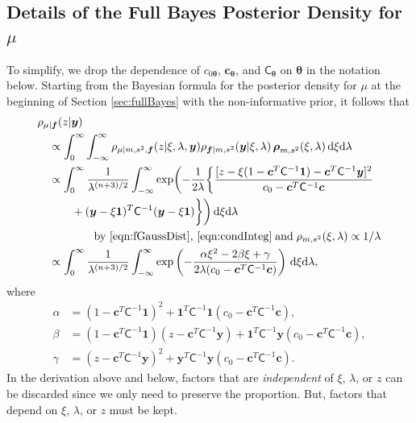 \documentclass{svjour3}                     %
\newcommand{\bm}[1]{\boldsymbol{#1}}
\newcommand{\D}[1]{\text{d}{#1}}
\newcommand{\vtheta}{{\bm{\theta}}}
\newcommand{\vc}{\bm{c}}
\newcommand{\vf}{\bm{f}}
\newcommand{\vrho}{\bm{\rho}}
\newcommand{\vy}{\bm{y}}
\newcommand{\vone}{\bm{1}}
\newcommand{\mC}{\mathsf{C}}
\begin{document}
\begin{appendices}
\section{Details of the Full Bayes Posterior Density for $\mu$} \label{appendix:full_bayes}
To simplify, we drop the dependence of $c_{0\vtheta}$, $\vc_\vtheta$, and $\mC_\vtheta$ on $\vtheta$ in the notation below.
Starting from the Bayesian formula for the posterior density for $\mu$ at the beginning of Section \ref{sec:fullBayes} with the non-informative prior, it follows that 
\begin{align*}
\MoveEqLeft[1]{\rho_{\mu|\vf}(z | \vy)}\\
& \propto \int_{0}^\infty \int_{-\infty}^\infty 
\rho_{\mu | m, s^2, \vf}(z | \xi, \lambda , \vy) 
  \rho_{\vf | m, s^2} (\vy | \xi, \lambda) \, \vrho_{m,s^2}(\xi,\lambda)  \, \D \xi \D \lambda \\
& \propto \displaystyle \int_{0}^\infty  \frac{1}{\lambda^{(n+3)/2}} 
 \int_{-\infty}^\infty  \exp \biggl( -\frac{1}{2\lambda}\biggl\{
\frac{
	[z - \xi (1 - \vc^T \mC^{-1} \vone)  -  \vc^T \mC^{-1} \vy]^2}
{c_0  -\vc ^T \mC^{-1} \vc}  \\
& \qquad + (\vy - \xi \vone)^T \mC^{-1}(\vy - \xi \vone) \biggr \} \biggr) \, \D \xi \D \lambda \\
& \qquad \qquad
\text{by \eqref{eqn:fGaussDist}, \eqref{eqn:condInteg}} \; \text{and} \; \rho_{m,s^2}(\xi,\lambda) \propto 1/\lambda \\
& \propto \displaystyle \int_{0}^\infty  \frac{1}{\lambda^{(n+3)/2}} 
\int_{-\infty}^\infty  \exp\left( -\frac{\alpha \xi^2 -2 \beta \xi + \gamma}{2\lambda(c_0  -\vc ^T \mC^{-1} \vc)} \right) \, \D \xi \D \lambda,
\end{align*}
where
\begin{align*}
\alpha & = (1 - \vc^T \mC^{-1} \vone)^2 + \vone^T \mC^{-1} \vone (c_0  -\vc ^T \mC^{-1} \vc),\\
\beta & =(1 - \vc^T \mC^{-1} \vone)(z - \vc^T \mC^{-1} \vy )  
+ \vone^T \mC^{-1} \vy (c_0  -\vc ^T \mC^{-1} \vc),\\
\gamma &  = (z - \vc^T \mC^{-1} \vy )^2  + \vy^T \mC^{-1} \vy (c_0  -\vc ^T \mC^{-1} \vc).
\end{align*}
In the derivation above and below, factors that are \emph{independent} of $\xi$, $\lambda$, or $z$ can be discarded since we only need to preserve the proportion.  But, factors that depend on $\xi$, $\lambda$, or $z$ must be kept.  

\end{appendices}
\end{document}
